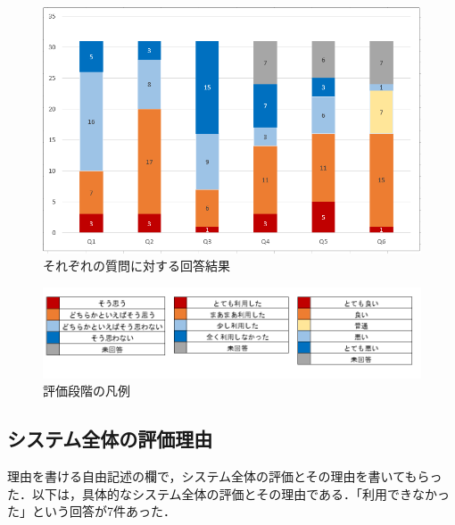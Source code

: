 \documentclass{risepaper}
\begin{document}
\begin{figure}[h]
\begin{center}
\includegraphics[scale=1.0]{img/flex_bar_graph.PNG}
\caption{それぞれの質問に対する回答結果}%
\label{fig:flex_bar_graph}
\end{center}%
\end{figure}%

\begin{figure}[h]
\begin{center}
\includegraphics[scale=1.0]{img/flex_usage_guide.PNG}
\caption{評価段階の凡例}%
\label{fing:flex_usage_guide}
\end{center}%
\end{figure}%

   		\subsection{システム全体の評価理由}

理由を書ける自由記述の欄で，システム全体の評価とその理由を書いてもらった．以下は，具体的なシステム全体の評価とその理由である．「利用できなかった」という回答が7件あった．
\end{document}
